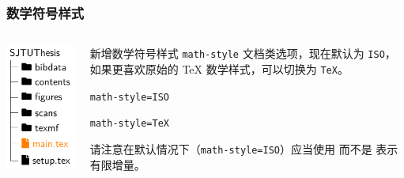 \begin{frame}[label={frame:math-style}]
  \frametitle{数学符号样式}
  \begin{columns}
    \begin{column}{0.35\textwidth}
      \includegraphics[page=2,scale=0.9]{support/figures/thesisdir.pdf}
    \end{column}
    \begin{column}{0.65\textwidth}
      新增数学符号样式 \texttt{math-style} 文档类选项，现在默认为 \texttt{ISO}，
      如果更喜欢原始的 \TeX{} 数学样式，可以切换为 \texttt{TeX}。

      \begin{minipage}[c]{10em}
        \texttt{math-style=ISO}
      \end{minipage}
      \begin{minipage}[c]{5cm}
      \end{minipage}
       
      \begin{minipage}[c]{10em}
        \texttt{math-style=TeX}
      \end{minipage}
      \begin{minipage}[c]{5cm}
      \end{minipage}

      \begin{block}{}
        请注意在默认情况下（\texttt{math-style=ISO}）应当使用  而不是  表示有限增量。
      \end{block}
    \end{column}
  \end{columns}
\end{frame}

